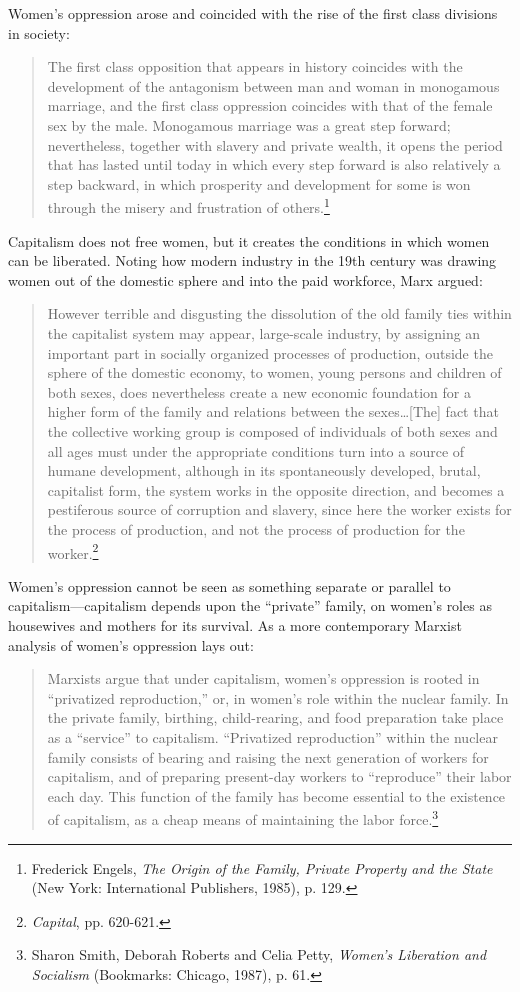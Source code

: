 Women's oppression arose and coincided with the rise of the first class divisions in society:

\blockquote{The first class opposition that appears in history coincides with the development of the antagonism between man and woman in monogamous marriage, and the first class oppression coincides with that of the female sex by the male. Monogamous marriage was a great step forward; nevertheless, together with slavery and private wealth, it opens the period that has lasted until today in which every step forward is also relatively a step backward, in which prosperity and development for some is won through the misery and frustration of others.\footnote{Frederick Engels, \emph{The Origin of the Family, Private Property and the State} (New York: International Publishers, 1985), p. 129.}}

Capitalism does not free women, but it creates the conditions in which women can be liberated. Noting how modern industry in the 19th century was drawing women out of the domestic sphere and into the paid workforce, Marx argued:

\blockquote{However terrible and disgusting the dissolution of the old family ties within the capitalist system may appear, large-scale industry, by assigning an important part in socially organized processes of production, outside the sphere of the domestic economy, to women, young persons and children of both sexes, does nevertheless create a new economic foundation for a higher form of the family and relations between the sexes\ldots[The] fact that the collective working group is composed of individuals of both sexes and all ages must under the appropriate conditions turn into a source of humane development, although in its spontaneously developed, brutal, capitalist form, the system works in the opposite direction, and becomes a pestiferous source of corruption and slavery, since here the worker exists for the process of production, and not the process of production for the worker.\footnote{\emph{Capital}, pp. 620-621.}}

Women's oppression cannot be seen as something separate or parallel to capitalism---capitalism depends upon the ``private'' family, on women's roles as housewives and mothers for its survival. As a more contemporary Marxist analysis of women's oppression lays out:

\blockquote{Marxists argue that under capitalism, women's oppression is rooted in ``privatized reproduction,'' or, in women's role within the nuclear family. In the private family, birthing, child-rearing, and food preparation take place as a ``service'' to capitalism. ``Privatized reproduction'' within the nuclear family consists of bearing and raising the next generation of workers for capitalism, and of preparing present-day workers to ``reproduce'' their labor each day. This function of the family has become essential to the existence of capitalism, as a cheap means of maintaining the labor force.\footnote{Sharon Smith, Deborah Roberts and Celia Petty, \emph{Women's Liberation and Socialism} (Bookmarks: Chicago, 1987), p. 61.}}

